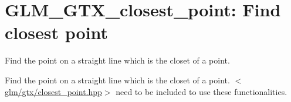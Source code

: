 \hypertarget{group__gtx__closest__point}{\section{\-G\-L\-M\-\_\-\-G\-T\-X\-\_\-closest\-\_\-point\-: \-Find closest point}
\label{group__gtx__closest__point}
}


\-Find the point on a straight line which is the closet of a point.  


\-Find the point on a straight line which is the closet of a point. $<$\hyperlink{closest__point_8hpp_source}{glm/gtx/closest\-\_\-point.\-hpp}$>$ need to be included to use these functionalities. 